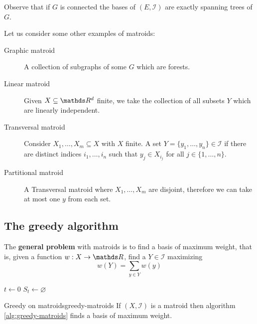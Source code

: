 \documentclass[12pt]{extarticle}
\begin{document}
Observe that if $G$ is connected the bases of $(E, \mathcal I)$ are exactly spanning trees of $G$.

Let us consider some other examples of matroids:
\begin{description}
	\item[Graphic matroid] A collection of subgraphs of some $G$ which are forests.
	\item[Linear matroid] Given $X \subseteq \R^d$ finite, we take the collection of all subsets $Y$
	      which are linearly independent.
	\item[Transversal matroid] Consider $X_1, \dots, X_m \subseteq X$ with $X$ finite. A set
	      $Y = \{y_1, \dots, y_n \} \in \mathcal I$ if there are distinct indices $i_1, \dots, i_n$ such
	      that $y_j \in X_{i_j}$ for all $j \in \{1, \dots, n\}$.

	\item[Partitional matroid] A Transversal matroid where $X_1, \dots, X_m$ are disjoint,
	      therefore we can take at most one $y$ from each set.
\end{description}

\subsection{The greedy algorithm}

The \textbf{general problem} with matroids is to find a basis of maximum weight, that is, given a
function $w: X \to \R$, find a $Y \in \mathcal I$ maximizing
\begin{equation}
	w(Y) = \sum_{y \in Y} w(y)
\end{equation}

\begin{algorithm}
	\caption{Greedy algorithm for matroids}
	\label{alg:greedy-matroids}

	$t \gets 0$\;
	$S_t \gets \varnothing$\;
\end{algorithm}

\begin{theorem}{Greedy on matroids}{greedy-matroids}
	If $(X, \mathcal I)$ is a matroid then algorithm \ref{alg:greedy-matroids} finds a basis of
	maximum weight.
\end{theorem}
\end{document}
